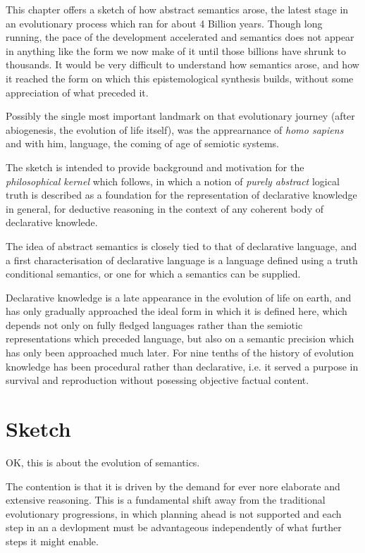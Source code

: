 This chapter offers a sketch of how abstract semantics arose, the latest stage in an evolutionary process which ran for about 4 Billion years.
Though long running, the pace of the development accelerated and semantics does not appear in anything like the form we now make of it until those billions have shrunk to thousands.
It would be very difficult to understand how semantics arose, and how it reached the form on which this epistemological synthesis builds, without some appreciation of what preceded it.

Possibly the single most important landmark on that evolutionary journey (after abiogenesis, the evolution of life itself), was the apprearnance of \emph{homo sapiens} and with him, language, the coming of age of semiotic systems.

The sketch is intended to provide background and motivation for the \emph{philosophical kernel} which follows, in which a notion of \emph{purely abstract} logical truth is described as a foundation for the representation of declarative knowledge in general, for deductive reasoning in the context of any coherent body of declarative knowlede.
 
The idea of abstract semantics is closely tied to that of declarative language, and a first characterisation of declarative language is a language defined using a truth conditional semantics, or one for which a semantics can be supplied.

Declarative knowledge is a late appearance in the evolution of life on earth, and has only gradually approached the ideal form in which it is defined here, which depends not only on fully fledged languages rather than the semiotic representations which preceded language, but also on a semantic precision which has only been approached much later.
For nine tenths of the history of evolution knowledge has been procedural rather than declarative, i.e. it served a purpose in survival and reproduction without posessing objective factual content.

\section{Sketch}

OK, this is about the evolution of semantics.

The contention is that it is driven by the demand for ever nore elaborate and extensive reasoning.
This is a fundamental shift away from the traditional evolutionary progressions, in which planning ahead is not supported and each step in an a devlopment must be advantageous independently of what further steps it might enable.




